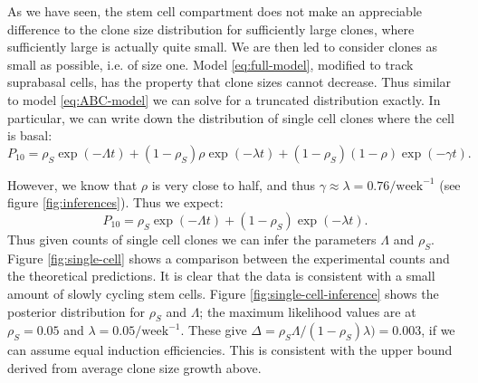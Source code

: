 \documentclass[10pt,UKenglish]{article}
\begin{document}
As we have seen, the stem cell compartment does not make an appreciable difference to the clone size distribution for sufficiently large clones, where sufficiently large is actually quite small. We are then led to consider clones as small as possible, i.e. of size one. Model \ref{eq:full-model}, modified to track suprabasal cells, has the property that clone sizes cannot decrease. Thus similar to model \ref{eq:ABC-model} we can solve for a truncated distribution exactly. In particular, we can write down the distribution of single cell clones where the cell is basal:
\begin{equation*}
P_{10} = \rho_S \exp(-\Lambda t) + (1-\rho_S) \rho \exp(-\lambda t) + (1-\rho_S) (1-\rho) \exp(-\gamma t).
\end{equation*}

However, we know that $\rho$ is very close to half, and thus $\gamma \approx \lambda = 0.76/\textrm{week}^{-1}$ (see figure \ref{fig:inferences}). Thus we expect: 
\begin{equation*}
P_{10} = \rho_S \exp(-\Lambda t) + (1-\rho_S) \exp(-\lambda t).
\end{equation*}
Thus given counts of single cell clones we can infer the parameters $\Lambda$ and $\rho_S$. Figure \ref{fig:single-cell} shows a comparison between the experimental counts and the theoretical predictions. It is clear that the data is consistent with a small amount of slowly cycling stem cells. Figure \ref{fig:single-cell-inference} shows the posterior distribution for $\rho_S$ and $\Lambda$; the maximum likelihood values are at $\rho_S = 0.05$ and $\lambda = 0.05/\textrm{week}^{-1}$. These give $\Delta = \rho_S \Lambda / (1-\rho_S) \lambda) = 0.003$, if we can assume equal induction efficiencies. This is consistent with the upper bound derived from average clone size growth above.
\end{document}
